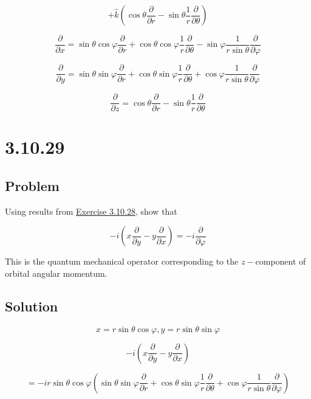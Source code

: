\documentclass[12pt]{article}
\begin{document}
\[
    + \hat{k} \left(\cos{\theta} \frac{\partial}{\partial r}
    - \sin{\theta} \frac{1}{r} \frac{\partial}{\partial \theta} \right)
\]

\[
    \frac{\partial}{\partial x} = \sin{\theta} \cos{\varphi} \frac{\partial}{\partial r}
    + \cos{\theta} \cos{\varphi} \frac{1}{r} \frac{\partial}{\partial \theta}
    - \sin{\varphi} \frac{1}{r \sin{\theta}} \frac{\partial}{\partial \varphi}
\]

\[
    \frac{\partial}{\partial y} = \sin{\theta} \sin{\varphi} \frac{\partial}{\partial r}
    + \cos{\theta} \sin{\varphi} \frac{1}{r} \frac{\partial}{\partial \theta}
    + \cos{\varphi} \frac{1}{r \sin{\theta}} \frac{\partial}{\partial \varphi}
\]

\[
    \frac{\partial}{\partial z} = \cos{\theta} \frac{\partial}{\partial r}
    - \sin{\theta} \frac{1}{r} \frac{\partial}{\partial \theta}
\]

\section{3.10.29}

\subsection{Problem}

Using results from \hyperref[3.10.28]{Exercise 3.10.28}, show that

\[
    -i \left(x \frac{\partial}{\partial y} - y \frac{\partial}{\partial x}\right)
    = - i \frac{\partial}{\partial \varphi}
\]

This is the quantum mechanical operator corresponding to the \(z-\)component of orbital
angular momentum.

\subsection{Solution}

\[
    x = r \sin{\theta} \cos{\varphi}, y = r \sin{\theta} \sin{\varphi}
\]

\[
    -i \left(x \frac{\partial}{\partial y} - y \frac{\partial}{\partial x}\right)
\]

\[
    =
    -i r \sin{\theta} \cos{\varphi}
    \left(
    \sin{\theta} \sin{\varphi} \frac{\partial}{\partial r}
    + \cos{\theta} \sin{\varphi} \frac{1}{r} \frac{\partial}{\partial \theta}
    + \cos{\varphi} \frac{1}{r \sin{\theta}} \frac{\partial}{\partial \varphi}
    \right)
\]
\end{document}
